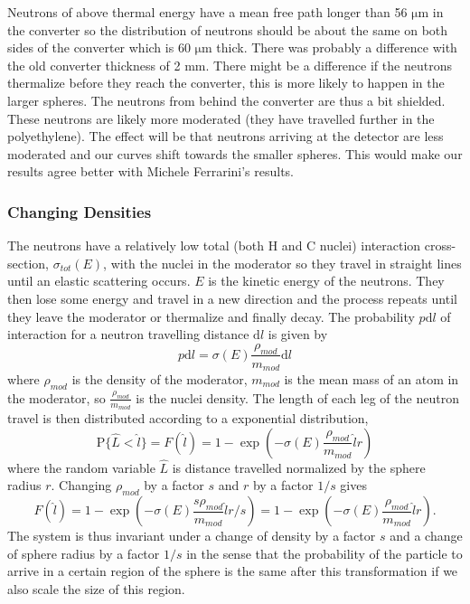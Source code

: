 \documentclass[a4paper,10pt]{article}
\begin{document}
 Neutrons of above thermal energy have a mean free path longer than 56 $\mathrm{\mu m}$ in the converter so the distribution of neutrons should be about the same on both sides of the converter which is 60 $\mathrm{\mu m}$ thick. There was probably a difference with the old converter thickness of 2 mm. There might be a difference if the neutrons thermalize before they reach the converter, this is more likely to happen in the larger spheres. The neutrons from behind the converter are thus a bit shielded. These neutrons are likely more moderated (they have travelled further in the polyethylene). The effect will be that neutrons arriving at the detector are less moderated and our curves shift towards the smaller spheres. This would make our results agree better with Michele Ferrarini's results.

\subsubsection{Changing Densities}
The neutrons have a relatively low total (both H and C nuclei) interaction cross-section, $\sigma_{tot}(E)$, with the nuclei in the moderator so they travel in straight lines until an elastic scattering occurs. $E$ is the kinetic energy of the neutrons. They then lose some energy and travel in a new direction and the process repeats until they leave the moderator or thermalize and finally decay. The probability $p\mathrm{d}l$ of interaction for a neutron travelling distance $\mathrm{d}l$ is given by
\begin{equation}
 p\mathrm{d}l=\sigma(E)\frac{\rho_{mod}}{m_{mod}}\mathrm{d}l
\end{equation}
where $\rho_{mod}$ is the density of the moderator, $m_{mod}$ is the mean mass of an atom in the moderator, so $\frac{\rho_{mod}}{m_{mod}}$ is the nuclei density. The length of each leg of the neutron travel is then distributed according to a exponential distribution,
 \begin{equation}
 \mathrm{P}\{\hat{L}<\hat{l}\}=F(\hat{l})=1-\exp\left(-\sigma(E)\frac{\rho_{mod}}{m_{mod}}\hat{l} r\right)
\end{equation}
where the random variable $\hat{L}$ is distance travelled normalized by the sphere radius $r$.
Changing $\rho_{mod}$ by a factor $s$ and $r$ by a factor $1/s$ gives
 \begin{equation}
 F(\hat{l})=1-\exp\left(-\sigma(E)\frac{s\rho_{mod}}{m_{mod}}\hat{l} r/s\right)=1-\exp\left(-\sigma(E)\frac{\rho_{mod}}{m_{mod}}\hat{l} r\right).
\end{equation}
The system is thus invariant under a change of density by a factor $s$ and a change of sphere radius by a factor $1/s$ in the sense that the probability of the particle to arrive in a certain region of the sphere is the same after this transformation if we also scale the size of this region.\\
\end{document}
